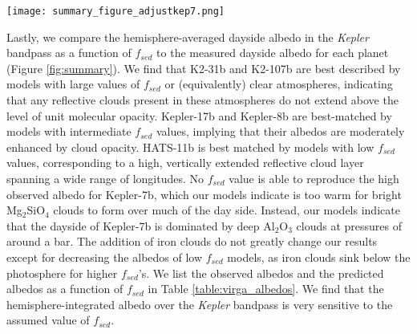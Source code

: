 \documentclass[twocolumn]{aastex63}
\begin{document}
\begin{figure*}[t]
\centering
\texttt{[image: summary\_figure\_adjustkep7.png]}
\caption{Geometric albedo predictions in the \emph{Kepler} optical bandpass compared with published albedo measurements as a function of equilibrium temperature. Albedo predictions from the full-resolution \texttt{Virga} models are shown as circles where the shading indicates the $f_{sed}$ value, going from 0.03 (light) to 6.0 (dark). \emph{Kepler} albedo measurements are shown as stars while the predicted albedos from the two-zone CARMA models are shown as triangles. Left panel excludes Fe in \texttt{Virga} calculations, while the right panel includes Fe condensates.}
\label{fig:summary}
\end{figure*}

Lastly, we compare the hemisphere-averaged dayside albedo in the \emph{Kepler} bandpass as a function of $f_{sed}$ to the measured dayside albedo for each planet (Figure \ref{fig:summary}). We find that K2-31b and K2-107b are best described by models with large values of $f_{sed}$ or (equivalently) clear atmospheres, indicating that any reflective clouds present in these atmospheres do not extend above the level of unit molecular opacity. Kepler-17b and Kepler-8b are best-matched by models with intermediate $f_{sed}$ values, implying that their albedos are moderately enhanced by cloud opacity. HATS-11b is best matched by models with low $f_{sed}$ values, corresponding to a high, vertically extended reflective cloud layer spanning a wide range of longitudes. No $f_{sed}$ value is able to reproduce the high observed albedo for Kepler-7b, which our models indicate is too warm for bright Mg$_2$SiO$_4$ clouds to form over much of the day side. Instead, our models indicate that the dayside of Kepler-7b is dominated by deep Al$_2$O$_3$ clouds at pressures of around a bar. The addition of iron clouds do not greatly change our results except for decreasing the albedos of low $f_{sed}$ models, as iron clouds sink below the photosphere for higher $f_{sed}$'s.  We list the observed albedos and the predicted albedos as a function of $f_{sed}$ in Table \ref{table:virga_albedos}.  We find that the hemisphere-integrated albedo over the \emph{Kepler} bandpass is very sensitive to the assumed value of $f_{sed}$.
\end{document}
